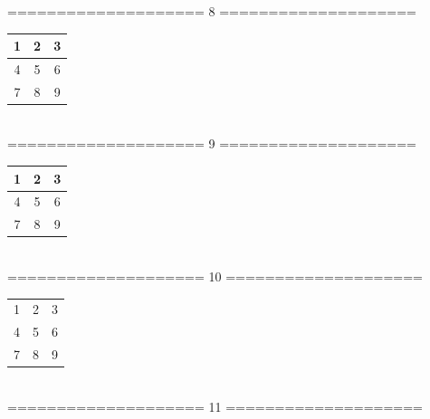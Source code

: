 \documentclass[12pt, a4paper, onecolumn]{article}
\begin{document}
\begin{center}
====================  8  ====================\\[15pt]


\begin{tabular}{||c||c||c||}
	
	\hline \hline
	1 & 2 & 3\\
	\hline \hline
	4 & 5 & 6\\
	\hline \hline
	7 & 8 & 9\\
	\hline \hline
	
\end{tabular}\\[20pt]



====================  9  ====================\\[15pt]

\begin{tabular}{c||c||c}
	
	1 & 2 & 3\\
	\hline \hline
	4 & 5 & 6\\
	\hline \hline
	7 & 8 & 9\\
	
\end{tabular}\\[20pt]



====================  10  ====================\\[15pt]

\begin{tabular}{c||c||c}
	
	1 & 2 & 3\\
	4 & 5 & 6\\
	7 & 8 & 9\\
	
\end{tabular}\\[20pt]


\newpage
====================  11  ====================\\[15pt]
%


\end{center}
\end{document}
